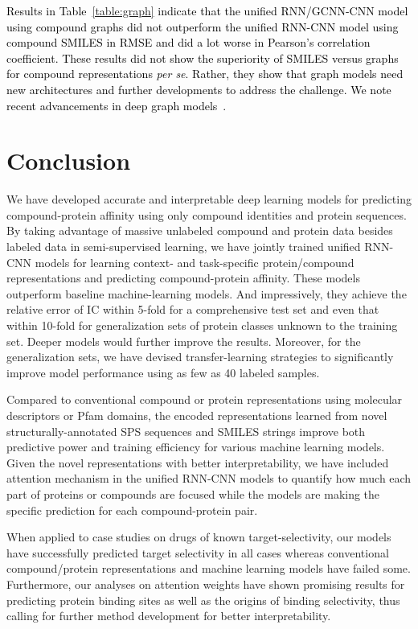 \documentclass[nocrop]{bioinfo}
\newcommand{\red}[1]{\textcolor{black}{#1}}
\begin{document}
\red{Results in Table~\ref{table:graph} indicate that the unified RNN/GCNN-CNN model using compound graphs did not  outperform the unified RNN-CNN model using compound SMILES in RMSE and did a lot worse in Pearson's correlation coefficient. These results did not show the superiority of SMILES versus graphs for compound representations \textit{per se}.  Rather, they show that graph models need new architectures and further developments to address the challenge. We note recent advancements in deep graph models~\citep{GilmerSRVD17,Coley17,VAE-graph18}.}


\section{Conclusion}

We have developed accurate and interpretable deep learning models for predicting compound-protein affinity using only compound identities and protein sequences.  By taking advantage of massive unlabeled compound and protein data besides labeled data in semi-supervised learning, we have jointly trained unified RNN-CNN models for learning context- and task-specific protein/compound representations and predicting compound-protein affinity.  These models outperform baseline machine-learning models.  And impressively, they achieve the relative error of IC within 5-fold for a comprehensive test set and even that within 10-fold for generalization sets of protein classes unknown to the training set. Deeper models would further improve the results. Moreover, for the generalization sets, we have devised transfer-learning strategies to significantly improve model performance using as few as 40 labeled samples.  

Compared to conventional compound or protein representations using molecular descriptors or Pfam domains, the encoded representations learned from novel structurally-annotated SPS sequences and SMILES strings improve both predictive power and training efficiency for various  machine learning models. Given the novel representations with better interpretability, we have included attention mechanism in the unified RNN-CNN models to quantify how much each part of proteins or compounds are focused while the models are making the specific  prediction for each compound-protein pair. 

When applied to case studies on drugs of known target-selectivity, our models have successfully predicted target selectivity in all cases whereas conventional compound/protein representations and machine learning models have failed some. Furthermore, our analyses on attention weights have shown promising results for predicting protein binding sites as well as the origins of binding selectivity, thus calling for further method development for better interpretability.  
\end{document}
